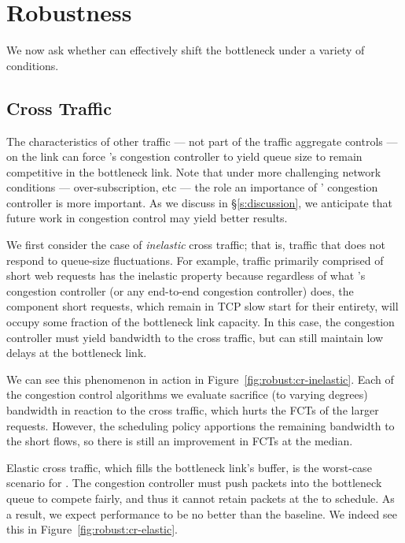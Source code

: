 \section{Robustness}\label{s:robust}

We now ask whether \name can effectively shift the bottleneck under a variety of conditions.

\subsection{Cross Traffic}\label{s:robust:cross}

The characteristics of other traffic --- not part of the traffic aggregate \name controls --- on the link can force \name's congestion controller to yield queue size to remain competitive in the bottleneck link.
Note that under more challenging network conditions --- over-subscription, etc --- the role an importance of \name' congestion controller is more important. As we discuss in \S\ref{s:discussion}, we anticipate that future work in congestion control may yield better results.


 We first consider the case of \emph{inelastic} cross traffic; that is, traffic that does not respond to queue-size fluctuations.
For example, traffic primarily comprised of short web requests has the inelastic property because regardless of what \name's congestion controller (or any end-to-end congestion controller) does, the component short requests, which remain in TCP slow start for their entirety, will occupy some fraction of the bottleneck link capacity.
In this case, the congestion controller must yield bandwidth to the cross traffic, but can still maintain low delays at the bottleneck link.

We can see this phenomenon in action in Figure~\ref{fig:robust:cr-inelastic}. 
Each of the congestion control algorithms we evaluate sacrifice (to varying degrees) bandwidth in reaction to the cross traffic, which hurts the FCTs of the larger requests.
However, the scheduling policy apportions the remaining bandwidth to the short flows, so there is still an improvement in FCTs at the median.


 Elastic cross traffic, which fills the bottleneck link's buffer, is the worst-case scenario for \name.
The congestion controller must push packets into the bottleneck queue to compete fairly, and thus it cannot retain packets at the \inbox to schedule.
As a result, we expect performance to be no better than the baseline.
We indeed see this in Figure~\ref{fig:robust:cr-elastic}.

